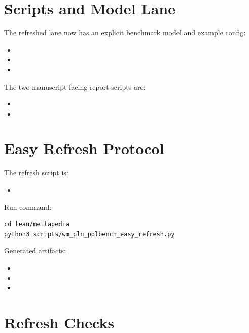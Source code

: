 \documentclass[11pt,openany]{report}
\begin{document}
\section{Scripts and Model Lane}

The refreshed lane now has an explicit benchmark model and example config:
\begin{itemize}
\item {}
\item {}
\item {}
\end{itemize}

The two manuscript-facing report scripts are:
\begin{itemize}
\item {}
\item {}
\end{itemize}

\section{Easy Refresh Protocol}

The refresh script is:
\begin{itemize}
\item {}
\end{itemize}

Run command:
\begin{lstlisting}
cd lean/mettapedia
python3 scripts/wm_pln_pplbench_easy_refresh.py
\end{lstlisting}

Generated artifacts:
\begin{itemize}
\item {}
\item {}
\item {}
\end{itemize}

\section{Refresh Checks}
\end{document}
